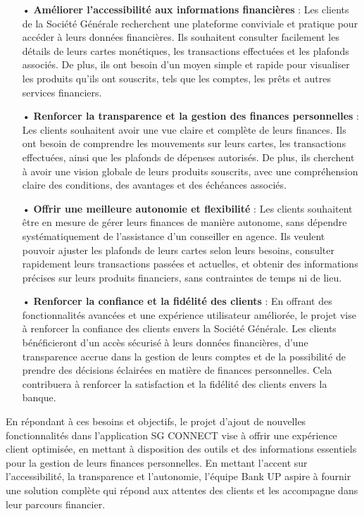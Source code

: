 \begin{itemize}
    \item[•] \textbf{Améliorer l'accessibilité aux informations financières} : Les clients de la Société Générale recherchent une plateforme conviviale et pratique pour accéder à leurs données financières. Ils souhaitent consulter facilement les détails de leurs cartes monétiques, les transactions effectuées et les plafonds associés. De plus, ils ont besoin d'un moyen simple et rapide pour visualiser les produits qu'ils ont souscrits, tels que les comptes, les prêts et autres services financiers.
    \item[•] \textbf{Renforcer la transparence et la gestion des finances personnelles} : Les clients souhaitent avoir une vue claire et complète de leurs finances. Ils ont besoin de comprendre les mouvements sur leurs cartes, les transactions effectuées, ainsi que les plafonds de dépenses autorisés. De plus, ils cherchent à avoir une vision globale de leurs produits souscrits, avec une compréhension claire des conditions, des avantages et des échéances associés.
    \item[•] \textbf{Offrir une meilleure autonomie et flexibilité} : Les clients souhaitent être en mesure de gérer leurs finances de manière autonome, sans dépendre systématiquement de l'assistance d'un conseiller en agence. Ils veulent pouvoir ajuster les plafonds de leurs cartes selon leurs besoins, consulter rapidement leurs transactions passées et actuelles, et obtenir des informations précises sur leurs produits financiers, sans contraintes de temps ni de lieu.
    \item[•] \textbf{Renforcer la confiance et la fidélité des clients} : En offrant des fonctionnalités avancées et une expérience utilisateur améliorée, le projet vise à renforcer la confiance des clients envers la Société Générale. Les clients bénéficieront d'un accès sécurisé à leurs données financières, d'une transparence accrue dans la gestion de leurs comptes et de la possibilité de prendre des décisions éclairées en matière de finances personnelles. Cela contribuera à renforcer la satisfaction et la fidélité des clients envers la banque.
\end{itemize}
En répondant à ces besoins et objectifs, le projet d'ajout de nouvelles fonctionnalités dans l'application SG CONNECT vise à offrir une expérience client optimisée, en mettant à disposition des outils et des informations essentiels pour la gestion de leurs finances personnelles. En mettant l'accent sur l'accessibilité, la transparence et l'autonomie, l'équipe Bank UP aspire à fournir une solution complète qui répond aux attentes des clients et les accompagne dans leur parcours financier.

